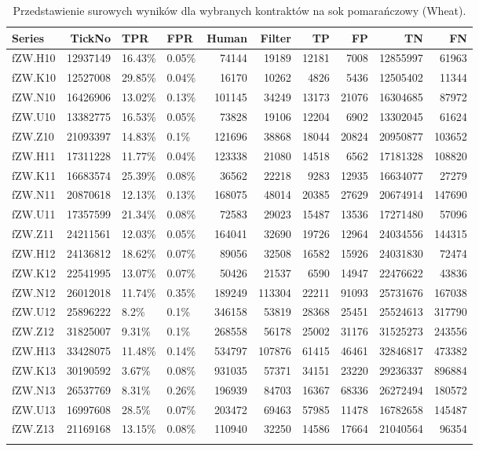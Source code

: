 \documentclass[a4paper,12pt,openany, DIV=calc, headsepline]{scrbook}
\begin{document}
{\scriptsize
\begin{longtable}{lrllrrrrrr}
  \hline
Series & TickNo & TPR & FPR & Human & Filter & TP & FP & TN & FN \\ 
  \hline
fZW.H10 & 12937149 & 16.43\% & 0.05\% & 74144 & 19189 & 12181 & 7008 & 12855997 & 61963 \\ 
  fZW.K10 & 12527008 & 29.85\% & 0.04\% & 16170 & 10262 & 4826 & 5436 & 12505402 & 11344 \\ 
  fZW.N10 & 16426906 & 13.02\% & 0.13\% & 101145 & 34249 & 13173 & 21076 & 16304685 & 87972 \\ 
  fZW.U10 & 13382775 & 16.53\% & 0.05\% & 73828 & 19106 & 12204 & 6902 & 13302045 & 61624 \\ 
  fZW.Z10 & 21093397 & 14.83\% & 0.1\% & 121696 & 38868 & 18044 & 20824 & 20950877 & 103652 \\ 
  fZW.H11 & 17311228 & 11.77\% & 0.04\% & 123338 & 21080 & 14518 & 6562 & 17181328 & 108820 \\ 
  fZW.K11 & 16683574 & 25.39\% & 0.08\% & 36562 & 22218 & 9283 & 12935 & 16634077 & 27279 \\ 
  fZW.N11 & 20870618 & 12.13\% & 0.13\% & 168075 & 48014 & 20385 & 27629 & 20674914 & 147690 \\ 
  fZW.U11 & 17357599 & 21.34\% & 0.08\% & 72583 & 29023 & 15487 & 13536 & 17271480 & 57096 \\ 
  fZW.Z11 & 24211561 & 12.03\% & 0.05\% & 164041 & 32690 & 19726 & 12964 & 24034556 & 144315 \\ 
  fZW.H12 & 24136812 & 18.62\% & 0.07\% & 89056 & 32508 & 16582 & 15926 & 24031830 & 72474 \\ 
  fZW.K12 & 22541995 & 13.07\% & 0.07\% & 50426 & 21537 & 6590 & 14947 & 22476622 & 43836 \\ 
  fZW.N12 & 26012018 & 11.74\% & 0.35\% & 189249 & 113304 & 22211 & 91093 & 25731676 & 167038 \\ 
  fZW.U12 & 25896222 & 8.2\% & 0.1\% & 346158 & 53819 & 28368 & 25451 & 25524613 & 317790 \\ 
  fZW.Z12 & 31825007 & 9.31\% & 0.1\% & 268558 & 56178 & 25002 & 31176 & 31525273 & 243556 \\ 
  fZW.H13 & 33428075 & 11.48\% & 0.14\% & 534797 & 107876 & 61415 & 46461 & 32846817 & 473382 \\ 
  fZW.K13 & 30190592 & 3.67\% & 0.08\% & 931035 & 57371 & 34151 & 23220 & 29236337 & 896884 \\ 
  fZW.N13 & 26537769 & 8.31\% & 0.26\% & 196939 & 84703 & 16367 & 68336 & 26272494 & 180572 \\ 
  fZW.U13 & 16997608 & 28.5\% & 0.07\% & 203472 & 69463 & 57985 & 11478 & 16782658 & 145487 \\ 
  fZW.Z13 & 21169168 & 13.15\% & 0.08\% & 110940 & 32250 & 14586 & 17664 & 21040564 & 96354 \\ 
   \hline
\hline
\caption{Przedstawienie surowych wyników dla wybranych kontraktów na sok pomarańczowy (Wheat).}
\label{tab:result3}
\end{longtable}}
\end{document}
